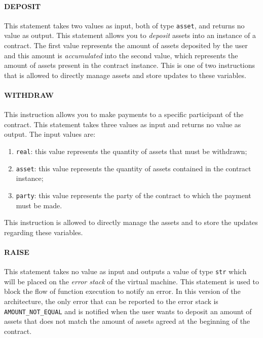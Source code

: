 \paragraph{DEPOSIT}

This statement takes two values as input, both of type \verb|asset|, and returns no value as output. This 
statement allows you to \textit{deposit} assets into an instance of a contract. The first value represents 
the amount of assets deposited by the user and this amount is \textit{accumulated} into the second value, 
which represents the amount of assets present in the contract instance. This is one of two instructions 
that is allowed to directly manage assets and store updates to these variables.

\paragraph{WITHDRAW}

This instruction allows you to make payments to a specific participant of the contract. This statement 
takes three values as input and returns no value as output. The input values are:
\begin{enumerate}
  \item \verb|real|: this value represents the quantity of assets that must be withdrawn;
  \item \verb|asset|: this value represents the quantity of assets contained in the contract instance;
  \item \verb|party|: this value represents the party of the contract to which the payment must be made.
\end{enumerate}

This instruction is allowed to directly manage the assets and to store the updates regarding these 
variables.

\paragraph{RAISE}

This statement takes no value as input and outputs a value of type \verb|str| which will be placed on the 
\textit{error stack} of the virtual machine. This statement is used to block the flow of function 
execution to notify an error. In this version of the architecture, the only error that can be reported to 
the error stack is \verb|AMOUNT_NOT_EQUAL| and is notified when the user wants to deposit an amount of 
assets that does not match the amount of assets agreed at the beginning of the contract.

